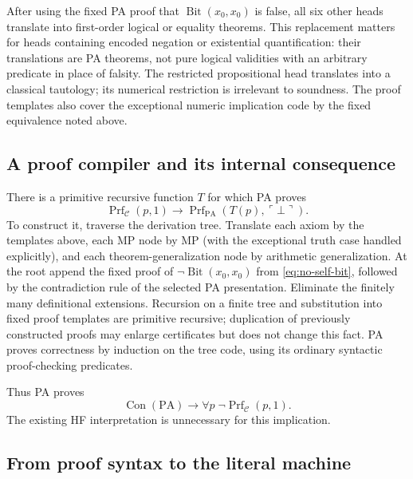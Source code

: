 After using the fixed PA proof that $\operatorname{Bit}(x_0,x_0)$ is false,
all six other heads translate into first-order logical or equality
theorems. This replacement matters for heads containing encoded negation or
existential quantification: their translations are PA theorems, not pure
logical validities with an arbitrary predicate in place of falsity.
The restricted propositional head translates into a classical
tautology; its numerical restriction is irrelevant to soundness.
The proof templates also cover the exceptional numeric implication code
by the fixed equivalence noted above.

\subsection{A proof compiler and its internal consequence}

There is a primitive recursive function $T$ for which PA proves
\begin{equation}\label{eq:proof-compiler-soundness}
 \operatorname{Prf}_{\mathcal C}(p,1)
 \longrightarrow
 \operatorname{Prf}_{\mathrm{PA}}(T(p),\ulcorner\bot\urcorner).
\end{equation}
To construct it, traverse the derivation tree. Translate each axiom by
the templates above, each MP node by MP (with the exceptional truth case
handled explicitly), and each theorem-generalization node by arithmetic
generalization. At the root append the fixed proof of
$\neg\operatorname{Bit}(x_0,x_0)$ from \eqref{eq:no-self-bit}, followed
by the contradiction rule of the selected PA presentation. Eliminate the
finitely many definitional extensions. Recursion on a finite tree and
substitution into fixed proof templates are primitive recursive;
duplication of previously constructed proofs may enlarge certificates
but does not change this fact. PA proves correctness by induction on the
tree code, using its ordinary syntactic proof-checking predicates.

Thus PA proves
\begin{equation}\label{eq:con-no-calculus-refutation}
 \operatorname{Con}(\mathrm{PA})\longrightarrow
 \forall p\;\neg\operatorname{Prf}_{\mathcal C}(p,1).
\end{equation}
The existing HF interpretation is unnecessary for this implication.

\subsection{From proof syntax to the literal machine}

